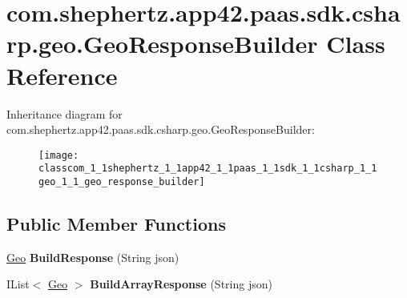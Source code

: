 \hypertarget{classcom_1_1shephertz_1_1app42_1_1paas_1_1sdk_1_1csharp_1_1geo_1_1_geo_response_builder}{\section{com.\+shephertz.\+app42.\+paas.\+sdk.\+csharp.\+geo.\+Geo\+Response\+Builder Class Reference}
\label{classcom_1_1shephertz_1_1app42_1_1paas_1_1sdk_1_1csharp_1_1geo_1_1_geo_response_builder}
}
Inheritance diagram for com.\+shephertz.\+app42.\+paas.\+sdk.\+csharp.\+geo.\+Geo\+Response\+Builder\+:\begin{figure}[H]
\begin{center}
\leavevmode
\texttt{[image: classcom\_1\_1shephertz\_1\_1app42\_1\_1paas\_1\_1sdk\_1\_1csharp\_1\_1geo\_1\_1\_geo\_response\_builder]}
\end{center}
\end{figure}
\subsection*{Public Member Functions}
\begin{DoxyCompactItemize}
\item 
\hypertarget{classcom_1_1shephertz_1_1app42_1_1paas_1_1sdk_1_1csharp_1_1geo_1_1_geo_response_builder_a24280ae0ba23e49da68a53f59394edc5}{\hyperlink{classcom_1_1shephertz_1_1app42_1_1paas_1_1sdk_1_1csharp_1_1geo_1_1_geo}{Geo} {\bfseries Build\+Response} (String json)}\label{classcom_1_1shephertz_1_1app42_1_1paas_1_1sdk_1_1csharp_1_1geo_1_1_geo_response_builder_a24280ae0ba23e49da68a53f59394edc5}

\item 
\hypertarget{classcom_1_1shephertz_1_1app42_1_1paas_1_1sdk_1_1csharp_1_1geo_1_1_geo_response_builder_a4b6bdc94016c675cbc8da1f6da1b24dc}{I\+List$<$ \hyperlink{classcom_1_1shephertz_1_1app42_1_1paas_1_1sdk_1_1csharp_1_1geo_1_1_geo}{Geo} $>$ {\bfseries Build\+Array\+Response} (String json)}\label{classcom_1_1shephertz_1_1app42_1_1paas_1_1sdk_1_1csharp_1_1geo_1_1_geo_response_builder_a4b6bdc94016c675cbc8da1f6da1b24dc}

\end{DoxyCompactItemize}
